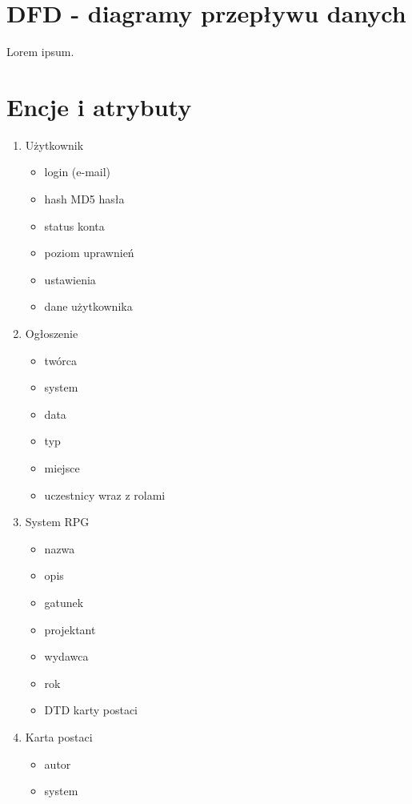 
\clearpage 
\section{DFD - diagramy przepływu danych}
\label{sec:DFD}

Lorem ipsum.


\section{Encje i atrybuty}
\label{sec:encje}

\begin{enumerate}
\item Użytkownik
	\begin{itemize}
	\item login (e-mail)
	\item hash MD5 hasła
	\item status konta
	\item poziom uprawnień
	\item ustawienia
	\item dane użytkownika
	\end{itemize}
\item Ogłoszenie
	\begin{itemize}
	\item twórca
	\item system
	\item data
	\item typ
	\item miejsce
	\item uczestnicy wraz z rolami
	\end{itemize}
\item System RPG
	\begin{itemize}
	\item nazwa
	\item opis
	\item gatunek
	\item projektant
	\item wydawca
	\item rok
	\item DTD karty postaci
	\end{itemize}
\item Karta postaci
	\begin{itemize}
	\item autor
	\item system

\end{itemize}
\end{enumerate}
